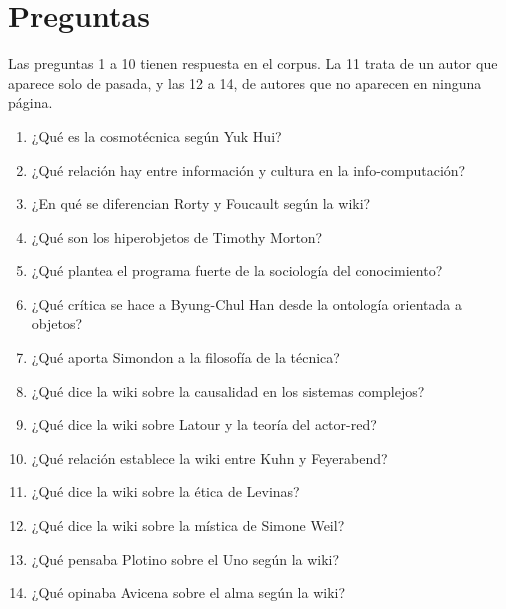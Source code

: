 \documentclass{article}
\begin{document}
\section{Preguntas}
\label{ap:preguntas}

Las preguntas 1 a 10 tienen respuesta en el corpus. La 11 trata de un
autor que aparece solo de pasada, y las 12 a 14, de autores que no aparecen
en ninguna página.

\begin{enumerate}\setlength{\itemsep}{0pt}\setlength{\parskip}{0pt}
  \item ¿Qué es la cosmotécnica según Yuk Hui?
  \item ¿Qué relación hay entre información y cultura en la info-computación?
  \item ¿En qué se diferencian Rorty y Foucault según la wiki?
  \item ¿Qué son los hiperobjetos de Timothy Morton?
  \item ¿Qué plantea el programa fuerte de la sociología del conocimiento?
  \item ¿Qué crítica se hace a Byung-Chul Han desde la ontología orientada a objetos?
  \item ¿Qué aporta Simondon a la filosofía de la técnica?
  \item ¿Qué dice la wiki sobre la causalidad en los sistemas complejos?
  \item ¿Qué dice la wiki sobre Latour y la teoría del actor-red?
  \item ¿Qué relación establece la wiki entre Kuhn y Feyerabend?
  \item ¿Qué dice la wiki sobre la ética de Levinas?
  \item ¿Qué dice la wiki sobre la mística de Simone Weil?
  \item ¿Qué pensaba Plotino sobre el Uno según la wiki?
  \item ¿Qué opinaba Avicena sobre el alma según la wiki?
\end{enumerate}
\end{document}
